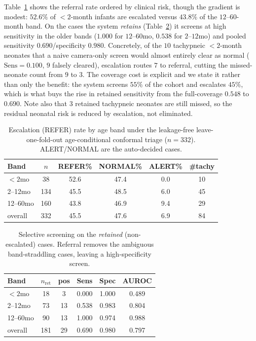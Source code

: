 Table~\ref{tab:escalation} shows the referral rate ordered by clinical risk, though the gradient is modest:
$52.6\%$ of $<2$-month infants are escalated versus $43.8\%$ of the $12$--$60$-month band. On the cases the
system \emph{retains} (Table~\ref{tab:retained}) it screens at high sensitivity in the older bands ($1.000$
for $12$--$60$mo, $0.538$ for $2$--$12$mo) and pooled sensitivity $0.690$/specificity $0.980$. Concretely,
of the $10$ tachypneic $<2$-month neonates that a naive camera-only screen would almost entirely clear as
normal ($\text{Sens}=0.100$, $9$ falsely cleared), escalation routes $7$ to referral, cutting the
missed-neonate count from $9$ to $3$. The coverage cost is explicit and we state it rather than only the
benefit: the system screens $55\%$ of the cohort and escalates $45\%$, which is what buys the rise in
retained sensitivity from the full-coverage $0.548$ to $0.690$. Note also that $3$ retained tachypneic
neonates are still missed, so the residual neonatal risk is reduced by escalation, not eliminated.

\begin{table}[!t]
\caption{Escalation (REFER) rate by age band under the leakage-free leave-one-fold-out age-conditional
conformal triage ($n{=}332$). ALERT/NORMAL are the auto-decided cases.}
\label{tab:escalation}\centering\small
\setlength{\tabcolsep}{4pt}
\begin{tabular}{@{}lccccc@{}}\toprule
Band & $n$ & REFER\% & NORMAL\% & ALERT\% & \#tachy\\\midrule
$<2$mo   & 38  & 52.6 & 47.4 & 0.0  & 10\\
2--12mo  & 134 & 45.5 & 48.5 & 6.0  & 45\\
12--60mo & 160 & 43.8 & 46.9 & 9.4  & 29\\
overall  & 332 & 45.5 & 47.6 & 6.9  & 84\\\bottomrule
\end{tabular}
\end{table}

\begin{table}[!t]
\caption{Selective screening on the \emph{retained} (non-escalated) cases. Referral removes the ambiguous
band-straddling cases, leaving a high-specificity screen.}
\label{tab:retained}\centering\small
\begin{tabular}{@{}lccccc@{}}\toprule
Band & $n_\text{ret}$ & pos & Sens & Spec & AUROC\\\midrule
$<2$mo   & 18  & 3  & 0.000 & 1.000 & 0.489\\
2--12mo  & 73  & 13 & 0.538 & 0.983 & 0.804\\
12--60mo & 90  & 13 & 1.000 & 0.974 & 0.988\\
overall  & 181 & 29 & 0.690 & 0.980 & 0.797\\\bottomrule
\end{tabular}
\end{table}

